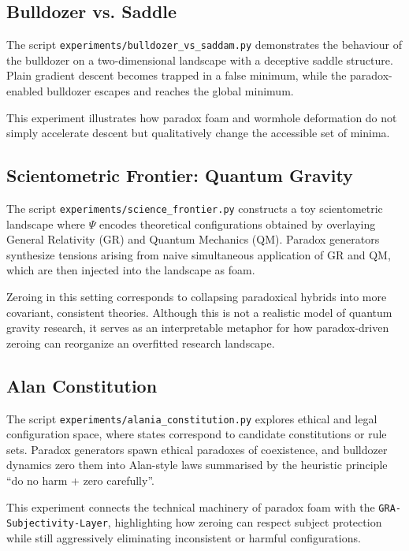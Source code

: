 \documentclass[11pt]{article}
\begin{document}
\subsection{Bulldozer vs. Saddle}

The script \texttt{experiments/bulldozer\_vs\_saddam.py} demonstrates the behaviour of the bulldozer on a two-dimensional landscape with a deceptive saddle structure. 
Plain gradient descent becomes trapped in a false minimum, while the paradox-enabled bulldozer escapes and reaches the global minimum. 

This experiment illustrates how paradox foam and wormhole deformation do not simply accelerate descent but qualitatively change the accessible set of minima.

\subsection{Scientometric Frontier: Quantum Gravity}

The script \texttt{experiments/science\_frontier.py} constructs a toy scientometric landscape where $\Psi$ encodes theoretical configurations obtained by overlaying General Relativity (GR) and Quantum Mechanics (QM). 
Paradox generators synthesize tensions arising from naive simultaneous application of GR and QM, which are then injected into the landscape as foam.

Zeroing in this setting corresponds to collapsing paradoxical hybrids into more covariant, consistent theories. 
Although this is not a realistic model of quantum gravity research, it serves as an interpretable metaphor for how paradox-driven zeroing can reorganize an overfitted research landscape.

\subsection{Alan Constitution}

The script \texttt{experiments/alania\_constitution.py} explores ethical and legal configuration space, where states correspond to candidate constitutions or rule sets. 
Paradox generators spawn ethical paradoxes of coexistence, and bulldozer dynamics zero them into Alan-style laws summarised by the heuristic principle ``do no harm + zero carefully''.

This experiment connects the technical machinery of paradox foam with the \texttt{GRA-Subjectivity-Layer}, highlighting how zeroing can respect subject protection while still aggressively eliminating inconsistent or harmful configurations.
\end{document}
